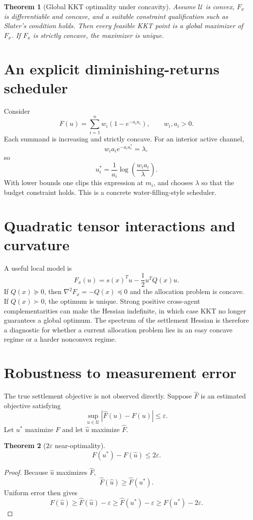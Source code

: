 \documentclass[11pt]{article}
\newtheorem{theorem}{Theorem}[section]
\begin{document}
\begin{theorem}[Global KKT optimality under concavity]
Assume $\mathcal U$ is convex, $F_x$ is differentiable and concave, and a suitable constraint qualification such as Slater's condition holds. Then every feasible KKT point is a global maximizer of $F_x$. If $F_x$ is strictly concave, the maximizer is unique.
\end{theorem}

\section{An explicit diminishing-returns scheduler}
Consider
\[
F(u)=\sum_{i=1}^n w_i(1-e^{-a_i u_i}),\qquad w_i,a_i>0.
\]
Each summand is increasing and strictly concave. For an interior active channel,
\[
w_i a_i e^{-a_i u_i^*}=\lambda,
\]
so
\[
\boxed{u_i^*=\frac1{a_i}\log\left(\frac{w_i a_i}{\lambda}\right).}
\]
With lower bounds one clips this expression at $m_i$, and chooses $\lambda$ so that the budget constraint holds. This is a concrete water-filling-style scheduler.

\section{Quadratic tensor interactions and curvature}
A useful local model is
\[
F_x(u)=s(x)^Tu-\frac12u^TQ(x)u.
\]
If $Q(x)\succeq0$, then $\nabla^2F_x=-Q(x)\preceq0$ and the allocation problem is concave. If $Q(x)\succ0$, the optimum is unique. Strong positive cross-agent complementarities can make the Hessian indefinite, in which case KKT no longer guarantees a global optimum. The spectrum of the settlement Hessian is therefore a diagnostic for whether a current allocation problem lies in an easy concave regime or a harder nonconvex regime.

\section{Robustness to measurement error}
The true settlement objective is not observed directly. Suppose $\widehat F$ is an estimated objective satisfying
\[
\sup_{u\in\mathcal U}|\widehat F(u)-F(u)|\le\varepsilon.
\]
Let $u^*$ maximize $F$ and let $\widehat u$ maximize $\widehat F$.

\begin{theorem}[$2\varepsilon$ near-optimality]
\[
\boxed{F(u^*)-F(\widehat u)\le2\varepsilon.}
\]
\end{theorem}
\begin{proof}
Because $\widehat u$ maximizes $\widehat F$,
\[
\widehat F(\widehat u)\ge\widehat F(u^*).
\]
Uniform error then gives
\[
F(\widehat u)\ge\widehat F(\widehat u)-\varepsilon
\ge\widehat F(u^*)-\varepsilon
\ge F(u^*)-2\varepsilon.
\]
\end{proof}
\end{document}
